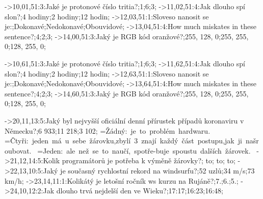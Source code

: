 




%

\def\lettertable#1#2{\ifcase#1
\switchletter#2:f,G,c,P,Y, ;\or %
\switchletter#2:q,x,E,A,H, ;\or %
\switchletter#2:U,I,Z,D,s, ;\or %
\switchletter#2:W,m,o,j,R, ;\or %
\switchletter#2:K,l,b,v,T, ;\or %
\switchletter#2:N,n, , , , ;\or %
\switchletter#2:F,g,C,p,y, ;\fi %
}


->10,01,51:3:Jaké je protonové číslo tritia?;1;6;3;%
->11,02,51:4:Jak dlouho spí slon?;4 hodiny;2 hodiny;12 hodin;%
->12,03,51:1:Sloveso nanosit se je:;Dokonavé;Nedokonavé;Obouvidové;%
->13,04,51:4:How much miskates in these sentence?;4;2;3;%
->14,00,51:3:Jaký je RGB kód oranžové?;255, 128, 0;255, 255, 0;128, 255, 0;%

->10,61,51:3:Jaké je protonové číslo tritia?;1;6;3;%
->11,62,51:4:Jak dlouho spí slon?;4 hodiny;2 hodiny;12 hodin;%
->12,63,51:1:Sloveso nanosit se je:;Dokonavé;Nedokonavé;Obouvidové;%
->13,64,51:4:How much miskates in these sentence?;4;2;3;%
->14,60,51:3:Jaký je RGB kód oranžové?;255, 128, 0;255, 255, 0;128, 255, 0;%

->20,11,13:5:Jaký byl nejvyšší oficiální denní přírus\-tek případů koronaviru v Německu?;6 933;11 218;3 102;%
=\vbox{\questionfont\baselineskip=40pt\hbox{Žádný: je to problém hardwaru.}\hbox{~}}
=\vbox{\questionfont\baselineskip=40pt\hbox{Čtyři: jeden má u sebe žárovku,}\hbox{zbylí 3 znají každý část postupu,}\hbox{jak ji našroubovat.}\hbox{~}}
=\vbox{\questionfont\baselineskip=40pt\hbox{Jeden: ale než se to naučí, spotře-}\hbox{buje spoustu dalších žárovek.}\hbox{~}}
->21,12,14:5:Kolik programátorů je potřeba k výměně žárovky?;{ \vbox to};{ \vbox to};{ \vbox to};%
->22,13,10:5:Jaký je současný rychlostní rekord na windsurfu?;52 uzlů;34 m/s;73 km/h;%
->23,14,11:1:Kolikátý je letošní ročník ws kurzu na Rujáně?;7.;6.;5.;%
->24,10,12:2:Jak dlouho trvá nejdelší den ve Wie\-ku?;17:17;16:23;16:48;%

